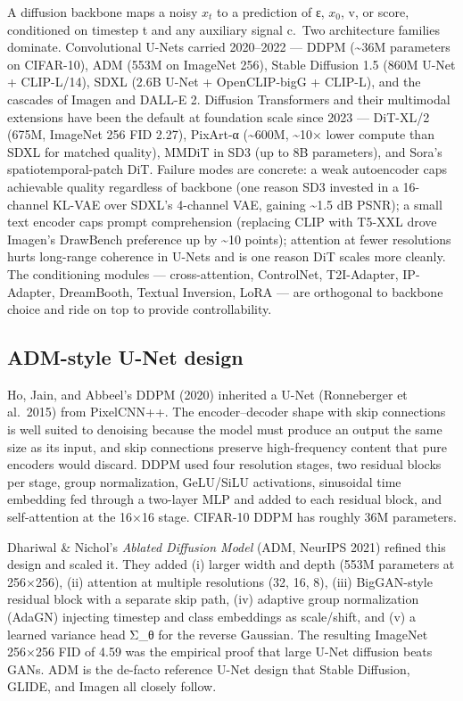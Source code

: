 \documentclass{article}
\begin{document}
A diffusion backbone maps a noisy \(x_t\) to a prediction of ε, \(x_0\), v, or score, conditioned on timestep t and any auxiliary signal c.~Two architecture families dominate. Convolutional U-Nets carried 2020--2022 --- DDPM (\textasciitilde36M parameters on CIFAR-10), ADM (553M on ImageNet 256), Stable Diffusion 1.5 (860M U-Net + CLIP-L/14), SDXL (2.6B U-Net + OpenCLIP-bigG + CLIP-L), and the cascades of Imagen and DALL-E 2. Diffusion Transformers and their multimodal extensions have been the default at foundation scale since 2023 --- DiT-XL/2 (675M, ImageNet 256 FID 2.27), PixArt-α (\textasciitilde600M, \textasciitilde10× lower compute than SDXL for matched quality), MMDiT in SD3 (up to 8B parameters), and Sora's spatiotemporal-patch DiT. Failure modes are concrete: a weak autoencoder caps achievable quality regardless of backbone (one reason SD3 invested in a 16-channel KL-VAE over SDXL's 4-channel VAE, gaining \textasciitilde1.5 dB PSNR); a small text encoder caps prompt comprehension (replacing CLIP with T5-XXL drove Imagen's DrawBench preference up by \textasciitilde10 points); attention at fewer resolutions hurts long-range coherence in U-Nets and is one reason DiT scales more cleanly. The conditioning modules --- cross-attention, ControlNet, T2I-Adapter, IP-Adapter, DreamBooth, Textual Inversion, LoRA --- are orthogonal to backbone choice and ride on top to provide controllability.

\subsection{ADM-style U-Net design \citep{ho2022classifierfreediff}}\label{adm-style-u-net-design-ho-2020-dhariwal-2021}

Ho, Jain, and Abbeel's DDPM (2020) inherited a U-Net (Ronneberger et al.~2015) from PixelCNN++. The encoder--decoder shape with skip connections is well suited to denoising because the model must produce an output the same size as its input, and skip connections preserve high-frequency content that pure encoders would discard. DDPM used four resolution stages, two residual blocks per stage, group normalization, GeLU/SiLU activations, sinusoidal time embedding fed through a two-layer MLP and added to each residual block, and self-attention at the 16×16 stage. CIFAR-10 DDPM has roughly 36M parameters.

Dhariwal \& Nichol's \emph{Ablated Diffusion Model} (ADM, NeurIPS 2021) refined this design and scaled it. They added (i) larger width and depth (553M parameters at 256×256), (ii) attention at multiple resolutions (32, 16, 8), (iii) BigGAN-style residual block with a separate skip path, (iv) adaptive group normalization (AdaGN) injecting timestep and class embeddings as scale/shift, and (v) a learned variance head Σ\_θ for the reverse Gaussian. The resulting ImageNet 256×256 FID of 4.59 was the empirical proof that large U-Net diffusion beats GANs. ADM is the de-facto reference U-Net design that Stable Diffusion, GLIDE, and Imagen all closely follow.
\end{document}

